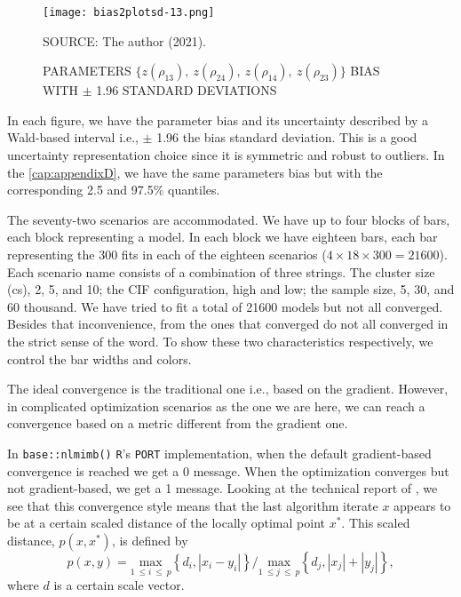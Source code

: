 \begin{figure}[H]
 \setlength{\abovecaptionskip}{.0001pt}
 \caption{PARAMETERS
          \(\{z(\rho_{13}),~z(\rho_{24}),~z(\rho_{14}),~z(\rho_{23})\}\)
          BIAS WITH \(\pm\) 1.96 STANDARD DEVIATIONS}
 \vspace{0.2cm}\centering
 \texttt{[image: bias2plotsd-13.png]}\\
 \begin{footnotesize}
  SOURCE: The author (2021).
 \end{footnotesize}
 \label{fig:biassdrhoz4}
\end{figure}

In each figure, we have the parameter bias and its uncertainty described
by a Wald-based interval i.e., \(\pm\) 1.96 the bias standard
deviation. This is a good uncertainty representation choice since it is
symmetric and robust to outliers. In the \autoref{cap:appendixD}, we
have the same parameters bias but with the corresponding 2.5 and 97.5\%
quantiles.

The seventy-two scenarios are accommodated. We have up to four blocks of
bars, each block representing a model. In each block we have eighteen
bars, each bar representing the 300 fits in each of the eighteen
scenarios (\(4 \times 18 \times 300 = 21600\)). Each scenario name
consists of a combination of three strings. The cluster size (cs), 2, 5,
and 10; the CIF configuration, high and low; the sample size, 5, 30, and
60 thousand. We have tried to fit a total of 21600 models but not all
converged. Besides that inconvenience, from the ones that converged do
not all converged in the strict sense of the word. To show these two
characteristics respectively, we control the bar widths and colors.

The ideal convergence is the traditional one i.e., based on the
gradient. However, in complicated optimization scenarios as the one we
are here, we can reach a convergence based on a metric different from
the gradient one.

In \texttt{base::nlmimb()} \texttt{R}'s \texttt{PORT} implementation,
when the default gradient-based convergence is reached we get a 0
message. When the optimization converges but not gradient-based, we get
a 1 message. Looking at the technical report of ,
we see that this convergence style means that the last algorithm iterate
\(x\) appears to be at a certain scaled distance of the locally optimal
point \(x^{\ast}\). This scaled distance, \(p(x, x^{\ast})\), is defined
by
\[
 p(x, y) =
 \underset{1~\leq i~\leq~p}{\text{max}}
 \left\{d_{i}, |x_{i} - y_{i}|\right\}
 \Big/
 \underset{1~\leq j~\leq~p}{\text{max}}
 \left\{d_{j}, |x_{j}| + |y_{j}|\right\},
\]
where \(d\) is a certain scale vector.

